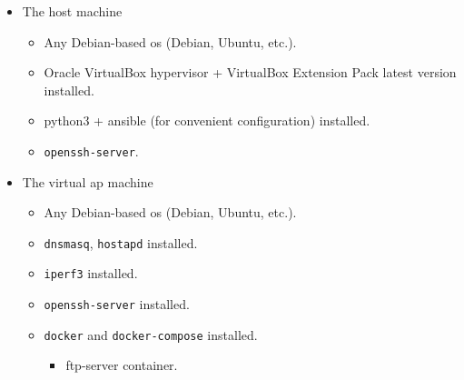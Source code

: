 \begin{itemize}
\tightlist
\item
The host machine

\begin{itemize}
	\tightlist
	\item
	Any Debian-based \acrshort{os} (Debian, Ubuntu, etc.).
	\item
	Oracle VirtualBox hypervisor + VirtualBox Extension Pack latest version installed.
	\item
	\gls{python3} + \gls{ansible} (for convenient configuration) installed.
	\item
	\texttt{openssh-server}.
\end{itemize}
\item
  The virtual \acrshort{ap} machine

  \begin{itemize}
  \tightlist
  \item
    Any Debian-based \acrshort{os} (Debian, Ubuntu, etc.).
  \item
    \texttt{dnsmasq}, \texttt{hostapd} installed.
  \item
    \texttt{iperf3} installed.
  \item
    \texttt{openssh-server} installed.
  \item
    \texttt{docker} and \texttt{docker-compose} installed.

    \begin{itemize}
    \tightlist
    \item
      \acrshort{ftp}-server container.
    \end{itemize}
  \end{itemize}
\end{itemize}
